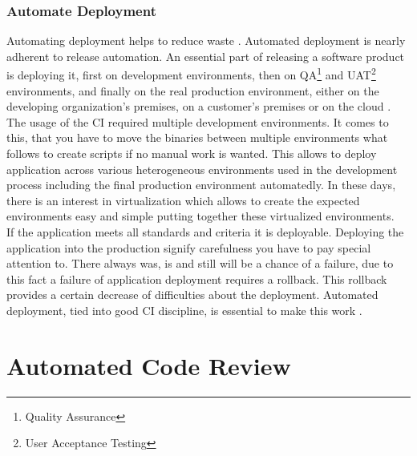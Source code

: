 \subsection{Automate Deployment}

Automating deployment helps to reduce waste \cite{CollabNet}. Automated deployment is nearly adherent to release automation. An essential part of releasing a software product is deploying it, first on development environments, then on QA\footnote{Quality Assurance} and UAT\footnote{User Acceptance Testing} environments, and finally on the real production environment, either on the developing organization's premises, on a customer's premises or on the cloud \cite{deployment_automation}. The usage of the CI required multiple development environments. It comes to this, that you have to move the binaries between multiple environments what follows to create scripts if no manual work is wanted. This allows to deploy application across various heterogeneous environments used in the development process including the final production environment automatedly. In these days, there is an interest in virtualization which allows to create the expected environments easy and simple putting together these virtualized environments.\\

If the application meets all standards and criteria it is deployable. Deploying the application into the production signify carefulness you have to pay special attention to. There always was, is and still will be a chance of a failure, due to this fact a failure of application deployment requires a rollback. This rollback provides a certain decrease of difficulties about the deployment. Automated deployment, tied into good CI discipline, is essential to make this work \cite{MartinFowler}.

\chapter{Automated Code Review}

